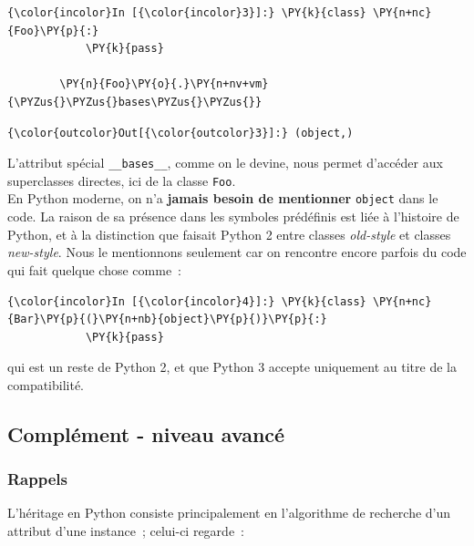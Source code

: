     \begin{Verbatim}[commandchars=\\\{\}]
{\color{incolor}In [{\color{incolor}3}]:} \PY{k}{class} \PY{n+nc}{Foo}\PY{p}{:}
            \PY{k}{pass}
        
        \PY{n}{Foo}\PY{o}{.}\PY{n+nv+vm}{\PYZus{}\PYZus{}bases\PYZus{}\PYZus{}}
\end{Verbatim}


\begin{Verbatim}[commandchars=\\\{\}]
{\color{outcolor}Out[{\color{outcolor}3}]:} (object,)
\end{Verbatim}
            
    L'attribut spécial \texttt{\_\_bases\_\_}, comme on le devine, nous
permet d'accéder aux superclasses directes, ici de la classe
\texttt{Foo}.\\

    En Python moderne, on n'a \textbf{jamais besoin de mentionner}
\texttt{object} dans le code. La raison de sa présence dans les symboles
prédéfinis est liée à l'histoire de Python, et à la distinction que
faisait Python 2 entre classes \emph{old-style} et classes
\emph{new-style}. Nous le mentionnons seulement car on rencontre encore
parfois du code qui fait quelque chose comme~:

    \begin{Verbatim}[commandchars=\\\{\}]
{\color{incolor}In [{\color{incolor}4}]:} \PY{k}{class} \PY{n+nc}{Bar}\PY{p}{(}\PY{n+nb}{object}\PY{p}{)}\PY{p}{:}
            \PY{k}{pass}
\end{Verbatim}


    qui est un reste de Python 2, et que Python 3 accepte uniquement au
titre de la compatibilité.

    \hypertarget{compluxe9ment---niveau-avancuxe9}{%
\subsection{Complément - niveau
avancé}\label{compluxe9ment---niveau-avancuxe9}}

    \hypertarget{rappels}{%
\subsubsection{Rappels}\label{rappels}}

    L'héritage en Python consiste principalement en l'algorithme de
recherche d'un attribut d'une instance~; celui-ci regarde~:

